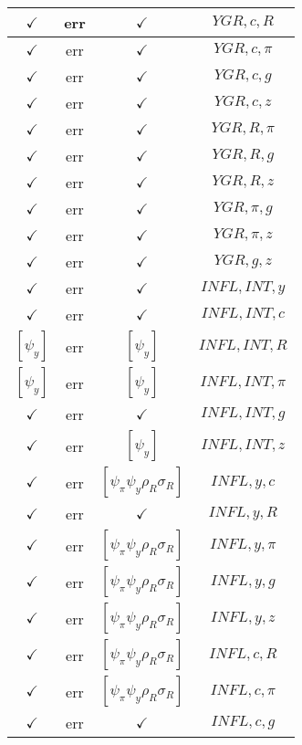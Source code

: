 \documentclass[a4paper,10pt]{article}
\begin{document}
\begin{longtable}{|c|c|c|c|}
\hline
$\checkmark$ & err & $\checkmark$ & ${YGR},{c},{R}$ \\
\hline
$\checkmark$ & err & $\checkmark$ & ${YGR},{c},{\pi}$ \\
\hline
$\checkmark$ & err & $\checkmark$ & ${YGR},{c},{g}$ \\
\hline
$\checkmark$ & err & $\checkmark$ & ${YGR},{c},{z}$ \\
\hline
$\checkmark$ & err & $\checkmark$ & ${YGR},{R},{\pi}$ \\
\hline
$\checkmark$ & err & $\checkmark$ & ${YGR},{R},{g}$ \\
\hline
$\checkmark$ & err & $\checkmark$ & ${YGR},{R},{z}$ \\
\hline
$\checkmark$ & err & $\checkmark$ & ${YGR},{\pi},{g}$ \\
\hline
$\checkmark$ & err & $\checkmark$ & ${YGR},{\pi},{z}$ \\
\hline
$\checkmark$ & err & $\checkmark$ & ${YGR},{g},{z}$ \\
\hline
$\checkmark$ & err & $\checkmark$ & ${INFL},{INT},{y}$ \\
\hline
$\checkmark$ & err & $\checkmark$ & ${INFL},{INT},{c}$ \\
\hline
$[\psi_y ]$ & err & $[\psi_y ]$ & ${INFL},{INT},{R}$ \\
\hline
$[\psi_y ]$ & err & $[\psi_y ]$ & ${INFL},{INT},{\pi}$ \\
\hline
$\checkmark$ & err & $\checkmark$ & ${INFL},{INT},{g}$ \\
\hline
$\checkmark$ & err & $[\psi_y ]$ & ${INFL},{INT},{z}$ \\
\hline
$\checkmark$ & err & $[\psi_\pi \psi_y \rho_R \sigma_R ]$ & ${INFL},{y},{c}$ \\
\hline
$\checkmark$ & err & $\checkmark$ & ${INFL},{y},{R}$ \\
\hline
$\checkmark$ & err & $[\psi_\pi \psi_y \rho_R \sigma_R ]$ & ${INFL},{y},{\pi}$ \\
\hline
$\checkmark$ & err & $[\psi_\pi \psi_y \rho_R \sigma_R ]$ & ${INFL},{y},{g}$ \\
\hline
$\checkmark$ & err & $[\psi_\pi \psi_y \rho_R \sigma_R ]$ & ${INFL},{y},{z}$ \\
\hline
$\checkmark$ & err & $[\psi_\pi \psi_y \rho_R \sigma_R ]$ & ${INFL},{c},{R}$ \\
\hline
$\checkmark$ & err & $[\psi_\pi \psi_y \rho_R \sigma_R ]$ & ${INFL},{c},{\pi}$ \\
\hline
$\checkmark$ & err & $\checkmark$ & ${INFL},{c},{g}$ \\

\end{longtable}
\end{document}
